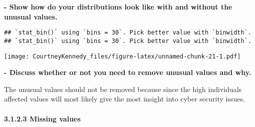 \documentclass[
]{article}
\newenvironment{Shaded}{\begin{snugshade}}{\end{snugshade}}
\newcommand{\AttributeTok}[1]{\textcolor[rgb]{0.77,0.63,0.00}{#1}}
\newcommand{\DecValTok}[1]{\textcolor[rgb]{0.00,0.00,0.81}{#1}}
\newcommand{\FunctionTok}[1]{\textcolor[rgb]{0.00,0.00,0.00}{#1}}
\newcommand{\NormalTok}[1]{#1}
\newcommand{\OtherTok}[1]{\textcolor[rgb]{0.56,0.35,0.01}{#1}}
\newcommand{\SpecialCharTok}[1]{\textcolor[rgb]{0.00,0.00,0.00}{#1}}
\newcommand{\StringTok}[1]{\textcolor[rgb]{0.31,0.60,0.02}{#1}}
\begin{document}
\textbf{- Show how do your distributions look like with and without the
unusual values.}

\begin{Shaded}
\end{Shaded}

\begin{verbatim}
## `stat_bin()` using `bins = 30`. Pick better value with `binwidth`.
## `stat_bin()` using `bins = 30`. Pick better value with `binwidth`.
\end{verbatim}

\texttt{[image: CourtneyKennedy\_files/figure-latex/unnamed-chunk-21-1.pdf]}

\textbf{- Discuss whether or not you need to remove unusual values and
why.}

The unusual values should not be removed because since the high
individuals affected values will most likely give the most insight into
cyber security issues.

\hypertarget{missing-values-1}{%
\paragraph{3.1.2.3 Missing values}\label{missing-values-1}}
\end{document}
